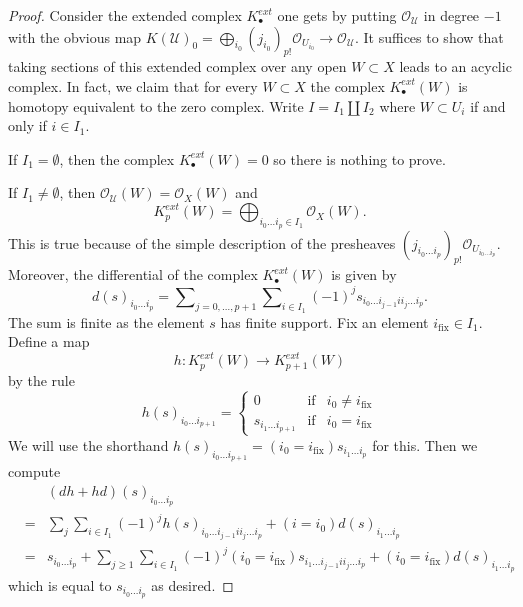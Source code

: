 \begin{proof}
Consider the extended complex $K^{ext}_\bullet$ one gets by putting
$\mathcal{O}_\mathcal{U}$ in degree $-1$ with the obvious map
$K(\mathcal{U})_0 =
\bigoplus_{i_0} (j_{i_0})_{p!}\mathcal{O}_{U_{i_0}} \to
\mathcal{O}_\mathcal{U}$.
It suffices to show that taking sections of this extended complex over
any open $W \subset X$ leads to an acyclic complex.
In fact, we claim that for every $W \subset X$ the complex
$K^{ext}_\bullet(W)$ is homotopy equivalent to the zero complex.
Write $I = I_1 \amalg I_2$ where $W \subset U_i$ if and only
if $i \in I_1$.

\medskip\noindent
If $I_1 = \emptyset$, then the complex $K^{ext}_\bullet(W) = 0$ so there is
nothing to prove.

\medskip\noindent
If $I_1 \not = \emptyset$, then
$\mathcal{O}_\mathcal{U}(W) = \mathcal{O}_X(W)$
and
$$
K^{ext}_p(W) =
\bigoplus\nolimits_{i_0 \ldots i_p \in I_1} \mathcal{O}_X(W).
$$
This is true because of the simple description of the presheaves
$(j_{i_0 \ldots i_p})_{p!}\mathcal{O}_{U_{i_0 \ldots i_p}}$.
Moreover, the differential of the complex $K^{ext}_\bullet(W)$
is given by
$$
d(s)_{i_0 \ldots i_p} =
\sum\nolimits_{j = 0, \ldots, p + 1} \sum\nolimits_{i \in I_1}
(-1)^j s_{i_0 \ldots i_{j - 1} i i_j \ldots i_p}.
$$
The sum is finite as the element $s$ has finite support.
Fix an element $i_{\text{fix}} \in I_1$. Define a map
$$
h : K^{ext}_p(W) \longrightarrow K^{ext}_{p + 1}(W)
$$
by the rule
$$
h(s)_{i_0 \ldots i_{p + 1}} =
\left\{
\begin{matrix}
0 & \text{if} & i_0 \not = i_{\text{fix}} \\
s_{i_1 \ldots i_{p + 1}} & \text{if} & i_0 = i_{\text{fix}}
\end{matrix}
\right.
$$
We will use the shorthand
$h(s)_{i_0 \ldots i_{p + 1}} = (i_0 = i_{\text{fix}}) s_{i_1 \ldots i_p}$
for this. Then we compute
\begin{eqnarray*}
& & (dh + hd)(s)_{i_0 \ldots i_p} \\
& = &
\sum_j \sum_{i \in I_1} (-1)^j h(s)_{i_0 \ldots i_{j - 1} i i_j \ldots i_p}
+
(i = i_0) d(s)_{i_1 \ldots i_p} \\
& = &
s_{i_0 \ldots i_p} +
\sum_{j \geq 1}\sum_{i \in I_1}
(-1)^j (i_0 = i_{\text{fix}}) s_{i_1 \ldots i_{j - 1} i i_j \ldots i_p}
+
(i_0 = i_{\text{fix}}) d(s)_{i_1 \ldots i_p}
\end{eqnarray*}
which is equal to $s_{i_0 \ldots i_p}$ as desired.
\end{proof}

